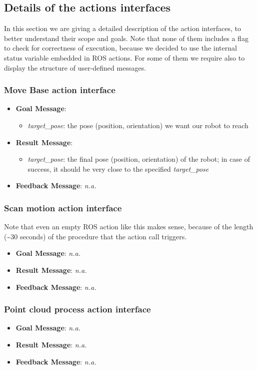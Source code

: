 \subsection{Details of the actions interfaces}

In this section we are giving a detailed description of the action interfaces, to better understand their scope and goals. Note that none of them includes a flag to check for correctness of execution, because we decided to use the internal status variable embedded in \ac{ROS} actions. For some of them we require also to display the structure of user-defined messages.

\subsubsection{Move Base action interface}
\begin{itemize}
	\item \textbf{Goal Message}:
		\begin{itemize}
			\item \textit{target\_pose}: the pose (position, orientation) we want our robot to reach
		\end{itemize} 
	\item  \textbf{Result Message}:
		\begin{itemize}
			\item \textit{target\_pose}: the final pose (position, orientation) of the robot; in case of success, it should be very close to the specified \textit{target\_pose}
		\end{itemize} 
	\item  \textbf{Feedback Message}: \textit{n.a.}
\end{itemize}

\subsubsection{Scan motion action interface}
Note that even an empty \ac{ROS} action like this makes sense, because of the length (\textasciitilde30 seconds) of the procedure that the action call triggers.
\begin{itemize}
	\item \textbf{Goal Message}: \textit{n.a.}
	\item  \textbf{Result Message}: \textit{n.a.}
	\item  \textbf{Feedback Message}: \textit{n.a.}
\end{itemize}

\subsubsection{Point cloud process action interface}
\begin{itemize}
	\item \textbf{Goal Message}: \textit{n.a.}
	\item  \textbf{Result Message}: \textit{n.a.}
	\item  \textbf{Feedback Message}: \textit{n.a.}
\end{itemize}

